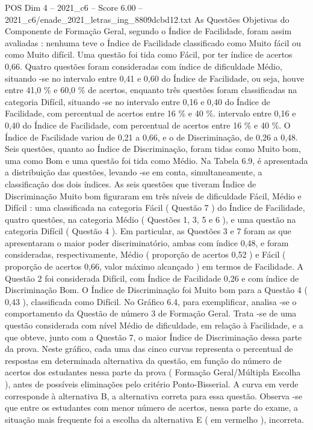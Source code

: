 \begin{textsample}{POS Dim 4 – 2021\_c6 – Score 6.00 – 2021\_c6/enade\_2021\_letras\_ing\_8809dcbd12.txt}
As Questões Objetivas do Componente de Formação Geral, segundo o Índice de Facilidade, foram assim avaliadas : nenhuma teve o Índice de Facilidade classificado como Muito fácil ou como Muito difícil.
Uma questão foi tida como Fácil, por ter índice de acertos 0,66.
Quatro questões foram consideradas com índice de dificuldade Médio, situando -se no intervalo entre 0,41 e 0,60 do Índice de Facilidade, ou seja, houve entre 41,0 \% e 60,0 \% de acertos, enquanto três questões foram classificadas na categoria Difícil, situando -se no intervalo entre 0,16 e 0,40 do Índice de Facilidade, com percentual de acertos entre 16 \% e 40 \%. intervalo entre 0,16 e 0,40 do Índice de Facilidade, com percentual de acertos entre 16 \% e 40 \%.
O Índice de Facilidade variou de 0,21 a 0,66, e o de Discriminação, de 0,26 a 0,48.
Seis questões, quanto ao Índice de Discriminação, foram tidas como Muito bom, uma como Bom e uma questão foi tida como Médio.
Na Tabela 6.9, é apresentada a distribuição das questões, levando -se em conta, simultaneamente, a classificação dos dois índices.
As seis questões que tiveram Índice de Discriminação Muito bom figuraram em três níveis de dificuldade Fácil, Médio e Difícil : uma classificada na categoria Fácil ( Questão 7 ) do Índice de Facilidade, quatro questões, na categoria Médio ( Questões 1, 3, 5 e 6 ), e uma questão na categoria Difícil ( Questão 4 ).
Em particular, as Questões 3 e 7 foram as que apresentaram o maior poder discriminatório, ambas com índice 0,48, e foram consideradas, respectivamente, Médio ( proporção de acertos 0,52 ) e Fácil ( proporção de acertos 0,66, valor máximo alcançado ) em termos de Facilidade.
A Questão 2 foi considerada Difícil, com Índice de Facilidade 0,26 e com índice de Discriminação Bom.
O Índice de Discriminação foi Muito bom para a Questão 4 ( 0,43 ), classificada como Difícil.
No Gráfico 6.4, para exemplificar, analisa -se o comportamento da Questão de número 3 de Formação Geral.
Trata -se de uma questão considerada com nível Médio de dificuldade, em relação à Facilidade, e a que obteve, junto com a Questão 7, o maior Índice de Discriminação dessa parte da prova.
Neste gráfico, cada uma das cinco curvas representa o percentual de respostas em determinada alternativa da questão, em função do número de acertos dos estudantes nessa parte da prova ( Formação Geral/Múltipla Escolha ), antes de possíveis eliminações pelo critério Ponto-Bisserial.
A curva em verde corresponde à alternativa B, a alternativa correta para essa questão.
Observa -se que entre os estudantes com menor número de acertos, nessa parte do exame, a situação mais frequente foi a escolha da alternativa E ( em vermelho ), incorreta.

\end{textsample}
